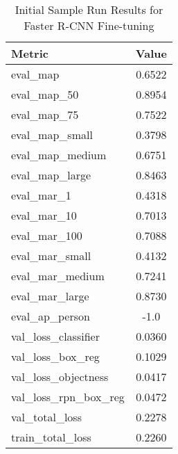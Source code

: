 \begin{table}[!htb]
    \centering
    \caption{Initial Sample Run Results for Faster R-CNN Fine-tuning}
    \label{tab:fasterrcnn_sample_results}
    \begin{tabular}{@{}lc@{}}
        \toprule
        Metric                      & Value   \\ \midrule
        {eval\_map}           & 0.6522  \\
        {eval\_map\_50}        & 0.8954  \\
        {eval\_map\_75}        & 0.7522  \\
        {eval\_map\_small}     & 0.3798  \\
        {eval\_map\_medium}    & 0.6751  \\
        {eval\_map\_large}     & 0.8463  \\
        {eval\_mar\_1}         & 0.4318  \\
        {eval\_mar\_10}        & 0.7013  \\
        {eval\_mar\_100}       & 0.7088  \\
        {eval\_mar\_small}     & 0.4132  \\
        {eval\_mar\_medium}    & 0.7241  \\
        {eval\_mar\_large}     & 0.8730  \\
        {eval\_ap\_person}     & -1.0    \\
        {val\_loss\_classifier}& 0.0360  \\
        {val\_loss\_box\_reg}  & 0.1029  \\
        {val\_loss\_objectness}& 0.0417  \\
        {val\_loss\_rpn\_box\_reg}& 0.0472  \\
        {val\_total\_loss}     & 0.2278  \\
        {train\_total\_loss}   & 0.2260  \\ \bottomrule
    \end{tabular}
\end{table}

